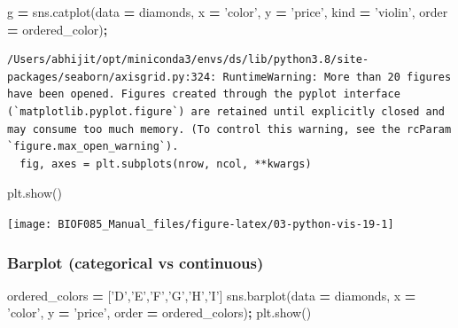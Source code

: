 \documentclass[
  letterpaper,
]{scrbook}
\newenvironment{Shaded}{\begin{snugshade}}{\end{snugshade}}
\newcommand{\NormalTok}[1]{#1}
\newcommand{\OperatorTok}[1]{\textcolor[rgb]{0.81,0.36,0.00}{\textbf{#1}}}
\newcommand{\StringTok}[1]{\textcolor[rgb]{0.31,0.60,0.02}{#1}}
\begin{document}
\begin{Shaded}
\begin{Highlighting}[]
\NormalTok{g }\OperatorTok{=}\NormalTok{ sns.catplot(data }\OperatorTok{=}\NormalTok{ diamonds, x }\OperatorTok{=} \StringTok{'color'}\NormalTok{, y }\OperatorTok{=} \StringTok{'price'}\NormalTok{, }
\NormalTok{                kind }\OperatorTok{=} \StringTok{'violin'}\NormalTok{, order }\OperatorTok{=}\NormalTok{ ordered_color)}\OperatorTok{;}
\end{Highlighting}
\end{Shaded}

\begin{verbatim}
/Users/abhijit/opt/miniconda3/envs/ds/lib/python3.8/site-packages/seaborn/axisgrid.py:324: RuntimeWarning: More than 20 figures have been opened. Figures created through the pyplot interface (`matplotlib.pyplot.figure`) are retained until explicitly closed and may consume too much memory. (To control this warning, see the rcParam `figure.max_open_warning`).
  fig, axes = plt.subplots(nrow, ncol, **kwargs)
\end{verbatim}

\begin{Shaded}
\begin{Highlighting}[]
\NormalTok{plt.show()}
\end{Highlighting}
\end{Shaded}

\begin{center}\texttt{[image: BIOF085\_Manual\_files/figure-latex/03-python-vis-19-1]} \end{center}

\hypertarget{barplot-categorical-vs-continuous}{%
\subsubsection{Barplot (categorical vs continuous)}\label{barplot-categorical-vs-continuous}}

\begin{Shaded}
\begin{Highlighting}[]
\NormalTok{ordered_colors }\OperatorTok{=}\NormalTok{ [}\StringTok{'D'}\NormalTok{,}\StringTok{'E'}\NormalTok{,}\StringTok{'F'}\NormalTok{,}\StringTok{'G'}\NormalTok{,}\StringTok{'H'}\NormalTok{,}\StringTok{'I'}\NormalTok{]}
\NormalTok{sns.barplot(data }\OperatorTok{=}\NormalTok{ diamonds, x }\OperatorTok{=} \StringTok{'color'}\NormalTok{, y }\OperatorTok{=} \StringTok{'price'}\NormalTok{, order }\OperatorTok{=}\NormalTok{ ordered_colors)}\OperatorTok{;}
\NormalTok{plt.show()}
\end{Highlighting}
\end{Shaded}
\end{document}
